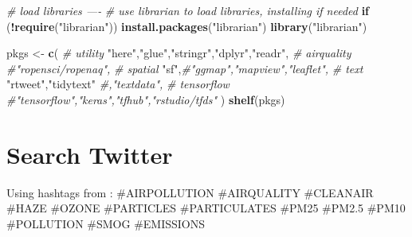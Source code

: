 \documentclass[]{book}
\newenvironment{Shaded}{\begin{snugshade}}{\end{snugshade}}
\newcommand{\CommentTok}[1]{\textcolor[rgb]{0.56,0.35,0.01}{\textit{#1}}}
\newcommand{\ControlFlowTok}[1]{\textcolor[rgb]{0.13,0.29,0.53}{\textbf{#1}}}
\newcommand{\KeywordTok}[1]{\textcolor[rgb]{0.13,0.29,0.53}{\textbf{#1}}}
\newcommand{\NormalTok}[1]{#1}
\newcommand{\OperatorTok}[1]{\textcolor[rgb]{0.81,0.36,0.00}{\textbf{#1}}}
\newcommand{\StringTok}[1]{\textcolor[rgb]{0.31,0.60,0.02}{#1}}
\begin{document}
\begin{Shaded}
\begin{Highlighting}[]
\CommentTok{# load libraries ----}
\CommentTok{# use librarian to load libraries, installing if needed}
\ControlFlowTok{if}\NormalTok{ (}\OperatorTok{!}\KeywordTok{require}\NormalTok{(}\StringTok{"librarian"}\NormalTok{)) }\KeywordTok{install.packages}\NormalTok{(}\StringTok{"librarian"}\NormalTok{)}
\KeywordTok{library}\NormalTok{(}\StringTok{"librarian"}\NormalTok{)}

\NormalTok{pkgs <-}\StringTok{ }\KeywordTok{c}\NormalTok{(}
  \CommentTok{# utility}
  \StringTok{"here"}\NormalTok{,}\StringTok{"glue"}\NormalTok{,}\StringTok{"stringr"}\NormalTok{,}\StringTok{"dplyr"}\NormalTok{,}\StringTok{"readr"}\NormalTok{,}
  \CommentTok{# airquality}
  \CommentTok{#"ropensci/ropenaq",}
  \CommentTok{# spatial}
  \StringTok{"sf"}\NormalTok{,}\CommentTok{#"ggmap","mapview","leaflet",}
  \CommentTok{# text}
  \StringTok{"rtweet"}\NormalTok{,}\StringTok{"tidytext"} \CommentTok{#,"textdata",}
  \CommentTok{# tensorflow}
  \CommentTok{#"tensorflow","keras","tfhub","rstudio/tfds"}
\NormalTok{  )}
\KeywordTok{shelf}\NormalTok{(pkgs)}
\end{Highlighting}
\end{Shaded}

\hypertarget{search-twitter}{%
\section{Search Twitter}\label{search-twitter}}

Using hashtags from \citep{gurajalaUnderstandingPublicResponse2019}: \#AIRPOLLUTION \#AIRQUALITY \#CLEANAIR \#HAZE \#OZONE \#PARTICLES \#PARTICULATES \#PM25 \#PM2.5 \#PM10 \#POLLUTION \#SMOG \#EMISSIONS
\end{document}
